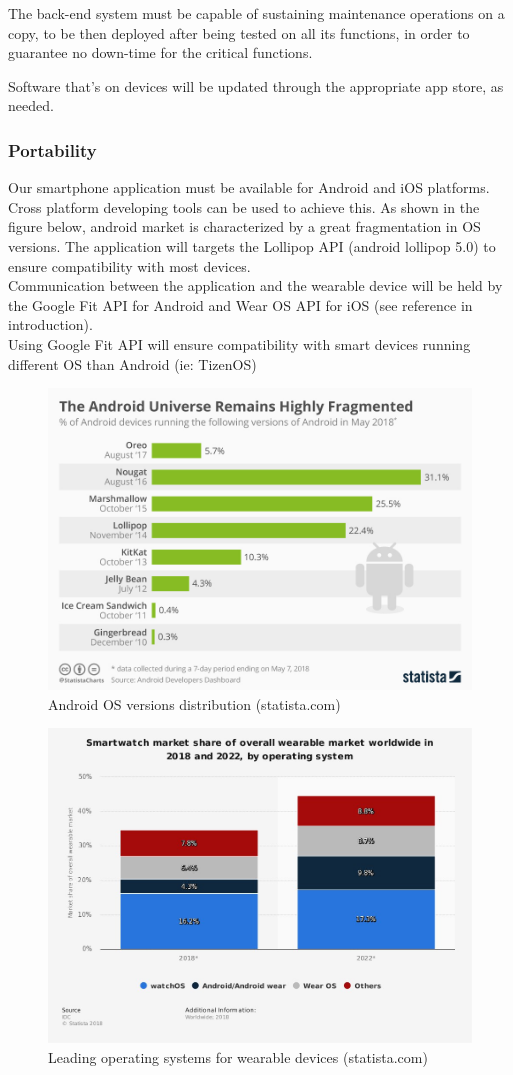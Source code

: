 \documentclass[../main.tex]{subfiles}
\begin{document}
The back-end system must be capable of sustaining maintenance operations on a copy, to be then deployed after being tested on all its functions, in order to guarantee no down-time for the critical functions.

Software that's on devices will be updated through the appropriate app store, as needed.

\subsubsection{Portability}

Our smartphone application must be available for Android and iOS platforms. Cross platform developing tools can be used to achieve this.
As shown in the figure below, android market is characterized by a great fragmentation in OS versions. The application will targets the Lollipop API (android lollipop 5.0) to ensure compatibility with most devices.\\
Communication between the application and the wearable device will be held by the Google Fit API for Android and Wear OS API for iOS (see reference in introduction).\\
Using Google Fit API will ensure compatibility with smart devices running different OS than Android (ie: TizenOS)
\begin{figure}[H]
	\center
	\includegraphics[scale=0.35]{images/androidFragmentation.jpg}
	\caption{Android OS versions distribution (statista.com)}
\end{figure}

\begin{figure}[H]
	\center
	\includegraphics[scale=0.35]{images/statista_wearableOs.jpg}
	\caption{Leading operating systems for wearable devices (statista.com)}
\end{figure}
\end{document}
